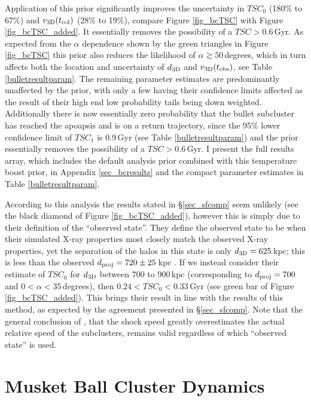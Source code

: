 Application of this prior significantly improves the uncertainty in $TSC_0$ (180\% to 67\%)  and $v_{\rm 3D}(t_{\rm col})$ (28\% to 19\%), compare Figure \ref{fig_bcTSC} with Figure \ref{fig_bcTSC_added}.
It essentially removes the possibility of a $TSC > 0.6$\,Gyr.
As expected from the $\alpha$ dependence shown by the green triangles in Figure \ref{fig_bcTSC} this prior also reduces the likelihood of $\alpha \gtrsim 50$\,degrees, which in turn affects both the location and uncertainty of $d_{\rm3D}$ and $v_{\rm 3D}(t_{\rm obs})$, see Table \ref{bulletresultparam}. 
The remaining parameter estimates are predominantly unaffected by the prior, with only a few having their confidence limits affected as the result of their high end low probability tails being down weighted.
Additionally there is now essentially zero probability that the bullet subcluster has reached the apoapsis and is on a return trajectory, since the 95\% lower confidence limit of $TSC_1$ is 0.9\,Gyr (see Table \ref{bulletresultparam}) and the prior essentially removes the possibility of a $TSC > 0.6$\,Gyr.
I present the full results array, which includes the default analysis prior combined with this temperature boost prior, in Appendix \ref{sec_bcresults} and the compact parameter estimates in Table \ref{bulletresultparam}.

According to this analysis the \citet{Springel:2007bg} results stated in \S\ref{sec_sfcomp} seem unlikely (see the black diamond of Figure \ref{fig_bcTSC_added}), however this is simply due to their definition of the ``observed state''.
They define the observed state to be when their simulated X-ray properties most closely match the observed X-ray properties, yet the separation of the halos in this state is only $d_{\rm 3D}=625$\,kpc; this is less than the observed $d_{\rm proj} = 720\pm 25$\,kpc \citep{Bradac:2006be}.
If we instead consider their estimate of $TSC_0$ for $d_{\rm 3D}$ between 700 to 900\,kpc (corresponding to  $d_{\rm proj} = 700$ and $0<\alpha<35$\,degrees), then $0.24<TSC_0<0.33$\,Gyr (see green bar of Figure \ref{fig_bcTSC_added}).
This brings their result in line with the results of this method, as expected by the agreement presented in \S\ref{sec_sfcomp}.
Note that the general conclusion of \citet{Springel:2007bg}, that the  shock speed greatly overestimates the actual relative speed of the subclusters, remains valid regardless of which ``observed state'' is used.

\section{Musket Ball Cluster Dynamics}\label{sec_musketball}

